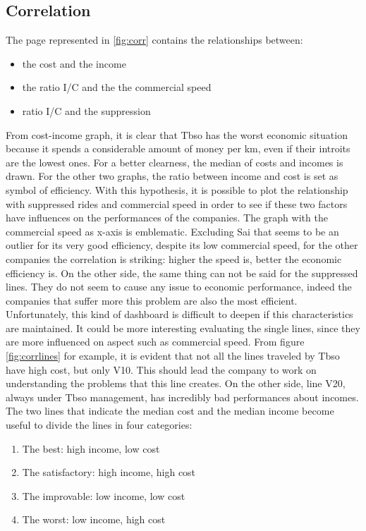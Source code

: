 \subsection{Correlation}
The page represented in \ref{fig:corr} contains the relationships between:
\begin{itemize}
  \item the cost and the income
   \item the ratio I/C and the the commercial speed
    \item ratio I/C and the suppression
\end{itemize}
From cost-income graph, it is clear that Tbso has the worst economic situation because it spends a considerable amount of money per km, even if their introits are the lowest ones. For a better clearness, the median of costs and incomes is drawn.
For the other two graphs, the ratio between income and cost is set as symbol of efficiency. With this hypothesis, it is possible to plot the relationship with suppressed rides and commercial speed in order to see if these two factors have influences on the performances of the companies. 
The graph with the commercial speed as x-axis is emblematic. Excluding Sai that seems to be an outlier for its very good efficiency, despite its low commercial speed, for the other companies the correlation is striking: higher the speed is, better the economic efficiency is. 
On the other side, the same thing can not be said for the suppressed lines. They do not seem to cause any issue to economic performance, indeed the companies that suffer more this problem are also the most efficient.
Unfortunately, this kind of dashboard is difficult to deepen if this characteristics are maintained. It could be more interesting evaluating the single lines, since they are more influenced on aspect such as commercial speed. From figure \ref{fig:corrlines} for example, it is evident that not all the lines traveled by Tbso have high cost, but only V10. This should lead the company to work on understanding the problems that this line creates. On the other side, line V20, always under Tbso management, has incredibly bad performances about incomes. 
The two lines that indicate the median cost and the median income become useful to divide the lines in four categories:
\begin{enumerate}
\item The best: high income, low cost
\item The satisfactory: high income, high cost
\item The improvable: low income, low cost
\item The worst: low income, high cost
\end{enumerate}
